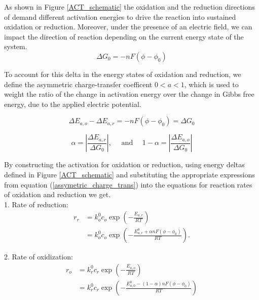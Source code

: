 \documentclass[lettersize,journal]{IEEEtran}
\begin{document}
As shown in Figure \ref{ACT_schematic} the oxidation and the reduction directions of demand different activation energies to drive the reaction into sustained oxidation or reduction. Moreover, under the presence of an electric field, we can impact the direction of reaction depending on the current energy state of the system.
\begin{equation}
\Delta G_{0}=-n F\left(\phi-\phi_{0}\right)
\end{equation}

\noindent To account for this delta in the energy states of oxidation and reduction, we define the asymmetric charge-transfer coefficent $0 < a < 1$, which is used to weight the ratio of the change in activation energy over the change in Gibbs free energy, due to the applied electric potential.

\begin{equation}
\Delta E_{a, o}-\Delta E_{a, r}=-n F\left(\phi-\phi_{0}\right)=\Delta G_{0}
\end{equation}

\begin{equation}\label{assymetric_charge_trans}
\alpha=\left|\frac{\Delta E_{a, r}}{\Delta G_{0}}\right|, \quad \text { and } \quad 1-\alpha=\left|\frac{\Delta E_{a, o}}{\Delta G_{0}}\right|
\end{equation}


\noindent By constructing the activation for oxidation or reduction, using energy deltas defined in Figure \ref{ACT_schematic} and substituting the appropriate expressions from equation (\ref{assymetric_charge_trans}) into the equations for reaction rates of oxidation and reduction we get. \\

1. Rate of reduction:
\begin{equation}
  \begin{aligned}
  r_{r} &=k_{o}^{0} c_{o} \exp \left(-\frac{E_{a, r}}{R T}\right) \\
  &=k_{o}^{0} c_{o} \exp \left(-\frac{E_{a, r}^{0}+\alpha n F\left(\phi-\phi_{0}\right)}{R T}\right) .
  \end{aligned}
\end{equation}

2. Rate of oxidization:
\begin{equation}
  \begin{aligned}
  r_{o} &=k_{r}^{0} c_{r} \exp \left(-\frac{E_{a, o}}{R T}\right) \\
  &=k_{r}^{0} c_{r} \exp \left(-\frac{E_{a, 0}^{0}-(1-\alpha) n F\left(\phi-\phi_{0}\right)}{R T}\right)
  \end{aligned}
\end{equation}
\end{document}
